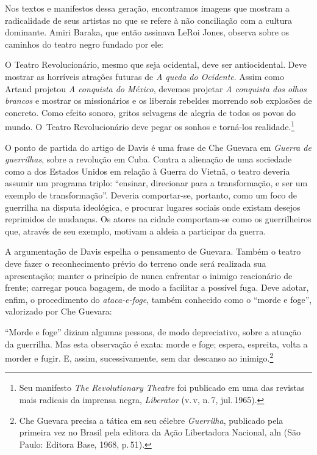 Nos textos e manifestos dessa geração, encontramos imagens que mostram a
radicalidade de seus artistas no que se refere à não conciliação com a
cultura dominante. Amiri Baraka, que então assinava LeRoi Jones, observa
sobre os caminhos do teatro negro fundado por ele:

\startblockquote
O Teatro Revolucionário, mesmo que seja ocidental, deve ser
antiocidental. Deve mostrar as horríveis atrações futuras de {\it A
queda do Ocidente}. Assim como Artaud projetou {\it A conquista do
México}, devemos projetar {\it A conquista dos olhos brancos} e mostrar
os missionários e os liberais rebeldes morrendo sob explosões de
concreto. Como efeito sonoro, gritos selvagens de alegria de todos os
povos do mundo. O~Teatro Revolucionário deve pegar os sonhos e torná-los
realidade.\footnote{Seu manifesto {\it The Revolutionary Theatre} foi
  publicado em uma das revistas mais radicais da imprensa negra,
  {\it Liberator} (v.\,{\sc v}, n.\,7, jul.\,1965).}
\stopblockquote


O ponto de partida do artigo de Davis é uma frase de Che Guevara em
{\it Guerra de guerrilhas}, sobre a revolução em Cuba. Contra a
alienação de uma sociedade como a dos Estados Unidos em relação à Guerra
do Vietnã, o teatro deveria assumir um programa triplo: “ensinar,
direcionar para a transformação, e ser um exemplo de transformação”.
Deveria comportar-se, portanto, como um foco de guerrilha na disputa
ideológica, e procurar lugares sociais onde existam desejos reprimidos
de mudanças. Os atores na cidade comportam-se como os guerrilheiros que,
através de seu exemplo, motivam a aldeia a participar da guerra.

A argumentação de Davis espelha o pensamento de Guevara. Também o teatro
deve fazer o reconhecimento prévio do terreno onde será realizada sua
apresentação; manter o princípio de nunca enfrentar o inimigo
reacionário de frente; carregar pouca bagagem, de modo a facilitar a
possível fuga. Deve adotar, enfim, o procedimento do {\it ataca-e-foge},
também conhecido como o “morde e foge”, valorizado por Che Guevara:

\startblockquote
“Morde e foge” diziam algumas pessoas, de modo depreciativo, sobre a
atuação da guerrilha. Mas esta observação é exata: morde e foge; espera,
espreita, volta a morder e fugir. E, assim, sucessivamente, sem dar
descanso ao inimigo.\footnote{Che Guevara precisa a tática em seu
  célebre {\it Guerrilha}, publicado pela primeira vez no Brasil pela
  editora da Ação Libertadora Nacional, {\sc aln} (São Paulo:
  Editora Base, 1968, p.\,51).}
\stopblockquote

